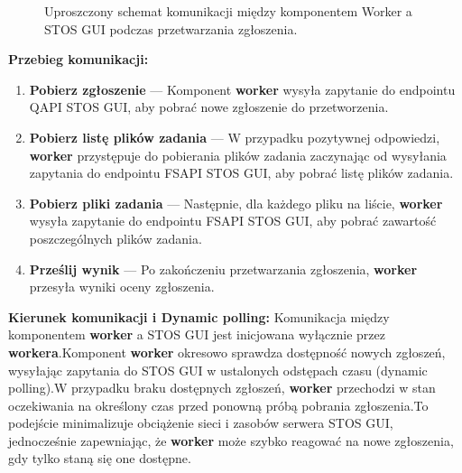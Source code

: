 \documentclass[12pt,a4paper]{article}
\begin{document}
\begin{figure}[H]
    \caption{Uproszczony schemat komunikacji między komponentem Worker a STOS GUI podczas przetwarzania zgłoszenia.}
\end{figure}

\textbf{Przebieg komunikacji:}
\begin{enumerate}
    \item \textbf{Pobierz zgłoszenie} --- Komponent \textbf{worker} wysyła zapytanie do endpointu QAPI STOS GUI, aby pobrać nowe zgłoszenie do przetworzenia.
    \item \textbf{Pobierz listę plików zadania} --- W przypadku pozytywnej odpowiedzi, \textbf{worker} przystępuje do pobierania plików zadania zaczynając od wysyłania zapytania do endpointu FSAPI STOS GUI, aby pobrać listę plików zadania.
    \item \textbf{Pobierz pliki zadania} --- Następnie, dla każdego pliku na liście, \textbf{worker} wysyła zapytanie do endpointu FSAPI STOS GUI, aby pobrać zawartość poszczególnych plików zadania.
    \item \textbf{Prześlij wynik} --- Po zakończeniu przetwarzania zgłoszenia, \textbf{worker} przesyła wyniki oceny zgłoszenia.
\end{enumerate}

\textbf{Kierunek komunikacji i Dynamic polling:}
Komunikacja między komponentem \textbf{worker} a STOS GUI jest inicjowana wyłącznie przez \textbf{workera}.\@ Komponent \textbf{worker} okresowo sprawdza dostępność nowych zgłoszeń, wysyłając zapytania do STOS GUI w ustalonych odstępach czasu (dynamic polling).\@ W przypadku braku dostępnych zgłoszeń, \textbf{worker} przechodzi w stan oczekiwania na określony czas przed ponowną próbą pobrania zgłoszenia.\@ To podejście minimalizuje obciążenie sieci i zasobów serwera STOS GUI, jednocześnie zapewniając, że \textbf{worker} może szybko reagować na nowe zgłoszenia, gdy tylko staną się one dostępne.
\end{document}
